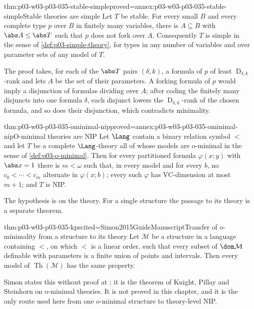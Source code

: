 \begin{hbtheorem}{thm:p03-w03-p03-035-stable-simple}{proved=annex:p03-w03-p03-035-stable-simple}{Stable theories are simple}
Let \(T\) be stable.  For every small \(B\) and every complete type \(p\)
over \(B\) in finitely many variables, there is \(A\subseteq B\) with
\(\abs A\leq\abs T\) such that \(p\) does not fork over \(A\).
Consequently \(T\) is simple in the sense of \cref{def:p03-simple-theory},
for types in any number of variables and over parameter sets of any model
of \(T\).
\end{hbtheorem}

The proof takes, for each of the \(\abs T\) pairs \((\delta,k)\), a formula
of \(p\) of least \(\operatorname{D}_{\delta,k}\)-rank and lets \(A\) be the
set of their parameters.  A forking formula of \(p\) would imply a
disjunction of formulas dividing over \(A\); after coding the finitely many
disjuncts into one formula \(\delta\), each disjunct lowers the
\(\operatorname{D}_{\delta,k}\)-rank of the chosen formula, and so does their
disjunction, which contradicts minimality.

\begin{hbtheorem}{thm:p03-w03-p03-035-ominimal-nip}{proved=annex:p03-w03-p03-035-ominimal-nip}{O-minimal theories are NIP}
Let \(\Lang\) contain a binary relation symbol \(<\) and let \(T\) be a
complete \(\Lang\)-theory all of whose models are o-minimal in the sense of
\cref{def:p03-o-minimal}.  Then for every partitioned formula
\(\varphi(x;y)\) with \(\abs x=1\) there is \(m<\omega\) such that, in every
model and for every \(b\), no \(c_0<\cdots<c_m\) alternate in
\(\varphi(x;b)\); every such \(\varphi\) has VC-dimension at most \(m+1\);
and \(T\) is NIP.
\end{hbtheorem}

The hypothesis is on the theory.  For a single structure the passage to its
theory is a separate theorem.

\begin{hbtheorem}{thm:p03-w03-p03-035-kps}{cited=Simon2015GuideManuscript}{Transfer of o-minimality from a structure to its theory}
Let \(\mathcal M\) be a structure in a language containing \(<\), on which
\(<\) is a linear order, such that every subset of \(\dom\mathcal M\)
definable with parameters is a finite union of points and intervals.  Then
every model of \(\operatorname{Th}(\mathcal M)\) has the same property.
\end{hbtheorem}

Simon states this without proof at
\cite[Section~A.1.3, p.~148]{Simon2015GuideManuscript}; it is the theorem of
Knight, Pillay and Steinhorn on o-minimal theories.  It is not proved in this
chapter, and it is the only route used here from one o-minimal structure to
theory-level NIP.

